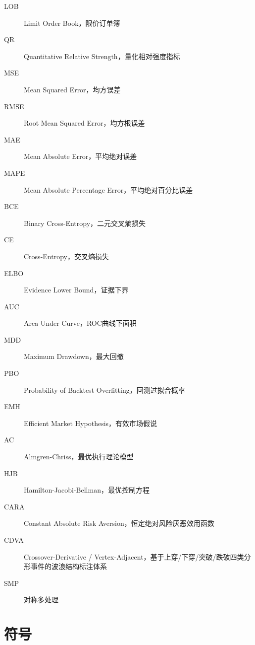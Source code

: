 \begin{description}
\item[LOB] Limit Order Book，限价订单簿
\item[QR] Quantitative Relative Strength，量化相对强度指标
\item[MSE] Mean Squared Error，均方误差
\item[RMSE] Root Mean Squared Error，均方根误差
\item[MAE] Mean Absolute Error，平均绝对误差
\item[MAPE] Mean Absolute Percentage Error，平均绝对百分比误差
\item[BCE] Binary Cross-Entropy，二元交叉熵损失
\item[CE] Cross-Entropy，交叉熵损失
\item[ELBO] Evidence Lower Bound，证据下界
\item[AUC] Area Under Curve，ROC曲线下面积
\item[MDD] Maximum Drawdown，最大回撤
\item[PBO] Probability of Backtest Overfitting，回测过拟合概率
\item[EMH] Efficient Market Hypothesis，有效市场假说
\item[AC] Almgren-Chriss，最优执行理论模型
\item[HJB] Hamilton-Jacobi-Bellman，最优控制方程
\item[CARA] Constant Absolute Risk Aversion，恒定绝对风险厌恶效用函数
\item[CDVA] Crossover-Derivative / Vertex-Adjacent，基于上穿/下穿/突破/跌破四类分形事件的波浪结构标注体系
\item[SMP] 对称多处理

\end{description}

\section*{符号}


